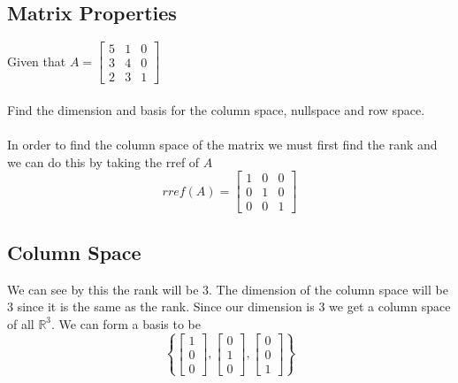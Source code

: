 \documentclass[12pt]{article}
\begin{document}
\subsection{Matrix Properties}
Given that $A = \begin{bmatrix}5 & 1 & 0 \\ 3 & 4 & 0 \\ 2 & 3 &1 \end{bmatrix}$
\\\\ Find the dimension and basis for the column space, nullspace and row space. \\\\
In order to find the column space of the matrix we must first find the rank and we can do this by taking the rref of $A$
\begin{equation*}
rref(A) = \begin{bmatrix}1 & 0 & 0 \\ 0 & 1 & 0 \\ 0 & 0 &1 \end{bmatrix}
\end{equation*}
\subsection{Column Space}
We can see by this the rank will be 3. The dimension of the column space will be 3 since it is the same as the rank. Since our dimension is 3 we get a column space of all $\mathbb{R}^3$. We can form a basis to be
\begin{equation*}\left\{\begin{bmatrix}1 \\ 0 \\ 0  \end{bmatrix},\begin{bmatrix}0 \\ 1 \\ 0  \end{bmatrix},\begin{bmatrix} 0 \\ 0 \\ 1  \end{bmatrix}\right\}\end{equation*}
\end{document}
